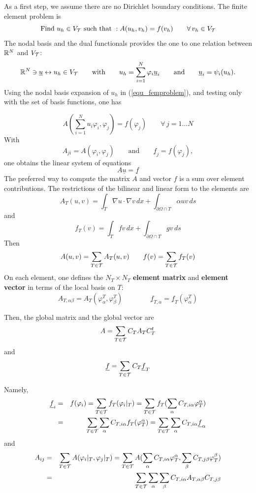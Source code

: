 As a first step, we assume there are no Dirichlet boundary conditions.
The finite element problem is
\begin{equation}
\label{equ_femproblem}
\mbox{Find } u_h \in V_{\cal T} \mbox{ such that } : A (u_h, v_h) = f(v_h) \qquad \forall \, v_h \in V_{\cal T}
\end{equation}
The nodal basis and the dual functionals provides the one to one relation 
between ${\mathbb R}^N$ and $V_{\cal T}$:
$$
{\mathbb R}^N \ni \underline u \leftrightarrow u_h \in V_{\cal T} \qquad \mbox{with} \qquad 
u_h = \sum_{i=1}^N \varphi_i \underline u_i \qquad \mbox{and} \qquad
\underline u_i = \psi_i (u_h).
$$
Using the nodal basis expansion of $u_h$ in (\ref{equ_femproblem}), and
testing only with the set of basis functions, one has

$$
A( \sum_{i=1}^N u_i \varphi_i, \varphi_j) = f(\varphi_j) \qquad \forall \, j = 1 \ldots N
$$
With
$$
A_{ji} = A(\varphi_i, \varphi_j) \qquad \mbox{and} \qquad \underline f_j = f(\varphi_j),
$$
one obtains the linear system of equations
$$
A \underline u = \underline f
$$
The preferred way to compute the matrix $A$ and vector $f$ is a sum over element 
contributions. The restrictions of the bilinear and linear form to the elements are
$$
A_T(u,v) = \int_T \nabla u \cdot \nabla v \, dx + 
        \int_{\partial \Omega \cap T} \alpha u v \, ds
$$
and
$$
f_T(v) = \int_T f v \, dx + 
        \int_{\partial \Omega \cap T} g v \, ds
$$
Then 
$$
A(u,v) = \sum_{T \in \cal T} A_T(u,v)  \qquad
f(v) = \sum_{T \in \cal T} f_T(v)
$$
On each element, one defines the $N_T \times N_T$ {\bf element matrix}  and 
{\bf element vector} in terms of the local basis on $T$:
$$
A_{T,\alpha \beta} = A_T (\varphi^T_\alpha, \varphi^T_\beta)
\qquad \qquad
\underline{f}_{T,\alpha} = \underline{f}_T (\varphi^T_\alpha)
$$

Then, the global matrix and the global vector are
$$
A = \sum_{T \in \cal T} C_T A_T C_T^t
$$
and
$$
\underline f = \sum_{T \in \cal T} C_T \underline f_T
$$


Namely,
\begin{eqnarray*}
\underline f_i & = & f(\varphi_i) = \sum_{T \in \cal T} f_T (\varphi_i|_T) = 
\sum_{T \in \cal T} f_T (\sum_\alpha C_{T,i\alpha} \varphi_T^\alpha) \\
& = &
\sum_{T \in \cal T} \sum_{\alpha} C_{T,i\alpha} f_T (\varphi_T^\alpha) =
\sum_{T \in \cal T}  \sum_{\alpha} C_{T,i\alpha} \underline f_\alpha
\end{eqnarray*}
and
\begin{eqnarray*}
A_{ij} & = & \sum_{T \in \cal T} A(\varphi_i|_T, \varphi_j|_T) = 
         \sum_{T \in \cal T} A (\sum_\alpha C_{T,i\alpha} \varphi_T^\alpha,
                                      \sum_\beta C_{T,j\beta} \varphi_T^\beta) \\
        & = & \sum_{T \in \cal T} \sum_\alpha \sum_\beta C_{T,i\alpha} A_{T,\alpha \beta} C_{T,j\beta}
\end{eqnarray*}

